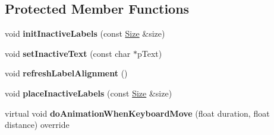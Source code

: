 \subsection*{Protected Member Functions}
\begin{DoxyCompactItemize}
\item 
\mbox{\label{classui_1_1EditBoxImplCommon_a40ffbfb4bc4ab4e1adb15a4d22300db1}} 
void {\bfseries init\+Inactive\+Labels} (const \hyperlink{classSize}{Size} \&size)
\item 
\mbox{\label{classui_1_1EditBoxImplCommon_a3631c486af3233e3797eb83712cdf70b}} 
void {\bfseries set\+Inactive\+Text} (const char $\ast$p\+Text)
\item 
\mbox{\label{classui_1_1EditBoxImplCommon_aadf2962f5b2af7feeac9339a5d7c72cf}} 
void {\bfseries refresh\+Label\+Alignment} ()
\item 
\mbox{\label{classui_1_1EditBoxImplCommon_a0a6502576bec606a33ab2386b3ededce}} 
void {\bfseries place\+Inactive\+Labels} (const \hyperlink{classSize}{Size} \&size)
\item 
\mbox{\label{classui_1_1EditBoxImplCommon_a9049ccd5a0b3c29ccb389fc5f7570529}} 
virtual void {\bfseries do\+Animation\+When\+Keyboard\+Move} (float duration, float distance) override
\end{DoxyCompactItemize}
